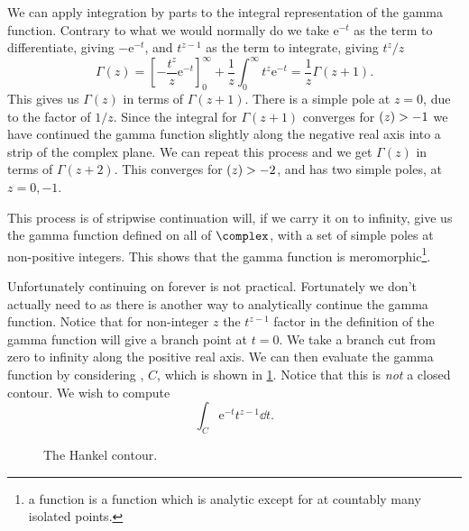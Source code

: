 \documentclass[fleqn]{NotesClass}
\newcommand*{\e}{\mathrm{e}}
\let\Re\relax
\let\Im\relax
\DeclareMathOperator{\Re}{Re}
\DeclareMathOperator{\Im}{Im}
\begin{document}
    We can apply integration by parts to the integral representation of the gamma function.
    Contrary to what we would normally do we take \(\e^{-t}\) as the term to differentiate, giving \(-\e^{-t}\), and \(t^{z - 1}\) as the term to integrate, giving \(t^{z}/z\)
    \begin{equation}
        \Gamma(z) = \left[ -\frac{t^{z}}{z} \e^{-t} \right]_{0}^{\infty} + \frac{1}{z}\int_{0}^{\infty} t^z\e^{-t} = \frac{1}{z}\Gamma(z + 1).
    \end{equation}
    This gives us \(\Gamma(z)\) in terms of \(\Gamma(z + 1)\).
    There is a simple pole at \(z = 0\), due to the factor of \(1/z\).
    Since the integral for \(\Gamma(z + 1)\) converges for \(\Re(z) > -1\) we have continued the gamma function slightly along the negative real axis into a strip of the complex plane.
    We can repeat this process and we get \(\Gamma(z)\) in terms of \(\Gamma(z + 2)\).
    This converges for \(\Re(z) > -2\), and has two simple poles, at \(z = 0, -1\).
    
    This process is of stripwise continuation will, if we carry it on to infinity, give us the gamma function defined on all of \(\complex\), with a set of simple poles at non-positive integers.
    This shows that the gamma function is meromorphic\footnote{a  function is a function which is analytic except for at countably many isolated points.}.
    
    Unfortunately continuing on forever is not practical.
    Fortunately we don't actually need to as there is another way to analytically continue the gamma function.
    Notice that for non-integer \(z\) the \(t^{z-1}\) factor in the definition of the gamma function will give a branch point at \(t = 0\).
    We take a branch cut from zero to infinity along the positive real axis.
    We can then evaluate the gamma function by considering , \(C\), which is shown in \cref{fig:hankel contour}.
    Notice that this is \emph{not} a closed contour.
    We wish to compute
    \begin{equation}
        \int_C \e^{-t}t^{z-1} \dd{t}.
    \end{equation}
    
    \begin{figure}
        \caption{The Hankel contour.}
        \label{fig:hankel contour}
    \end{figure}
    
\end{document}
